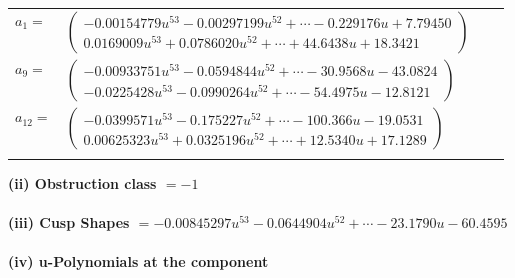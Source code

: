 \documentclass[1p]{elsarticle_modified}
\theoremstyle{definition}
\begin{document}
\begin{tabular}{m{7pt} m{180pt} m{7pt} m{180pt} }
\flushright $a_{1}=$&$\begin{pmatrix}-0.00154779 u^{53}-0.00297199 u^{52}+\cdots-0.229176 u+7.79450\\0.0169009 u^{53}+0.0786020 u^{52}+\cdots+44.6438 u+18.3421\end{pmatrix}$ \\
\flushright $a_{9}=$&$\begin{pmatrix}-0.00933751 u^{53}-0.0594844 u^{52}+\cdots-30.9568 u-43.0824\\-0.0225428 u^{53}-0.0990264 u^{52}+\cdots-54.4975 u-12.8121\end{pmatrix}$ \\
\flushright $a_{12}=$&$\begin{pmatrix}-0.0399571 u^{53}-0.175227 u^{52}+\cdots-100.366 u-19.0531\\0.00625323 u^{53}+0.0325196 u^{52}+\cdots+12.5340 u+17.1289\end{pmatrix}$\\&\end{tabular}
\flushleft \textbf{(ii) Obstruction class $= -1$}\\~\\
\flushleft \textbf{(iii) Cusp Shapes $= -0.00845297 u^{53}-0.0644904 u^{52}+\cdots-23.1790 u-60.4595$}\\~\\
\newpage\renewcommand{\arraystretch}{1}
\flushleft \textbf{(iv) u-Polynomials at the component}\newline \\
\end{document}
